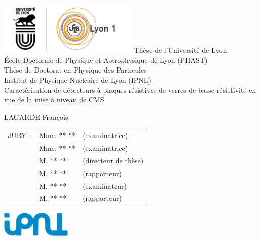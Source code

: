\thispagestyle{empty}
\begin{center}	
	\includegraphics[width=0.5\textwidth]{PG/logo.png}
	\vfill
	Thèse de l'Université de Lyon \\
	\bigskip
	École Doctorale de Physique et Astrophysique de Lyon (PHAST)\\[1em]
	\bigskip
	Thèse de Doctorat en Physique des Particules \\
	\bigskip
	Institut de Physique Nucléaire de Lyon (IPNL)\\
	\vfill
	\Huge Caractérisation de détecteurs à plaques résistives de verres de basse résistivité en vue de la mise à niveau de CMS
	\vspace{10mm}
	\normalsize
	
	\textsc{LAGARDE} François
	\vfill
	\begin{tabular}{lll}
		JURY~: & Mme. ** \textsc{**} & (examinatrice)\\
		& Mme. ** \textsc{**}       & (examinatrice)\\
		& M.  **  \textsc{**}         & (directeur de thèse)\\
		& M.  ** \textsc{**}     & (rapporteur)\\
		& M.  ** \textsc{**}            & (examinateur)\\
		& M.  ** \textsc{**}     & (rapporteur)\\
	\end{tabular}
	\vfill
	\includegraphics[width=0.25\textwidth]{MPG/Logo_IPNL.jpg}
	\vspace{2cm}
\end{center} 
\restoregeometry
